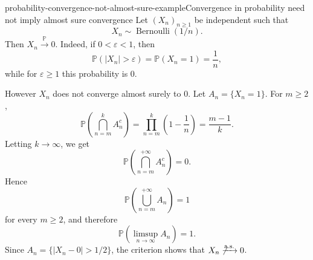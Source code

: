 \documentclass[preview]{standalone}
\begin{document}
\begin{snippetexample}{probability-convergence-not-almost-sure-example}{Convergence in probability need not imply almost sure convergence}
    Let \((X_n)_{n\geq1}\) be independent 
    such that
    \[
        X_n\sim\operatorname{Bernoulli}(1/n).
    \]
    Then \(X_n\xrightarrow{\mathbb{P}}0\). Indeed, if
    \(0<\varepsilon<1\), then
    \[
        \mathbb{P}(|X_n|>\varepsilon)=\mathbb{P}(X_n=1)=\frac{1}{n},
    \]
    while for \(\varepsilon\geq1\) this probability is \(0\).

    However \(X_n\) does not converge almost surely to \(0\). Let
    \(A_n=\{X_n=1\}\). For \(m\geq2\),
    \[
        \mathbb{P}\left(\bigcap_{n=m}^{k} A_n^c\right)
        =
        \prod_{n=m}^{k}\left(1-\frac{1}{n}\right)
        =
        \frac{m-1}{k}.
    \]
    Letting \(k\to\infty\), we get
    \[
        \mathbb{P}\left(\bigcap_{n=m}^{+\infty} A_n^c\right)=0.
    \]
    Hence
    \[
        \mathbb{P}\left(\bigcup_{n=m}^{+\infty}A_n\right)=1
    \]
    for every \(m\geq2\), and therefore
    \[
        \mathbb{P}\left(\limsup_{n\to\infty}A_n\right)=1.
    \]
    Since \(A_n=\{|X_n-0|>1/2\}\), the
    \almostsureconvergence criterion shows that
    \(X_n\not\xrightarrow{\mathrm{a.s.}}0\).
\end{snippetexample}
\end{document}
